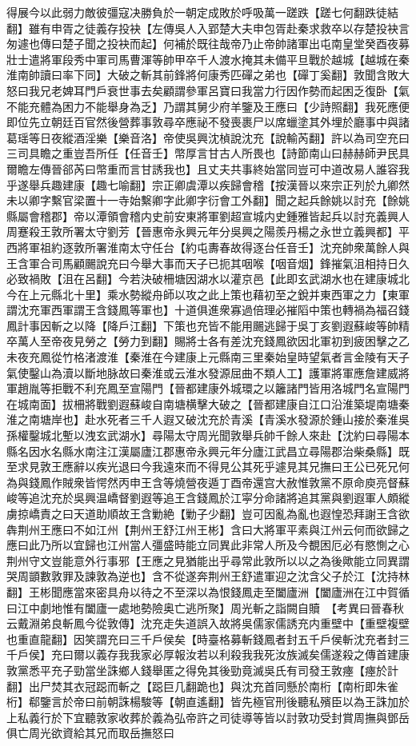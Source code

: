 得展今以此弱力敵彼彊寇决勝負於一朝定成敗於呼吸萬一蹉跌【蹉七何翻跌徒結翻】雖有申胥之徒義存投袂【左傳吳人入郢楚大夫申包胥赴秦求救卒以存楚投袂言匆遽也傳曰楚子聞之投袂而起】何補於既往哉帝乃止帝帥諸軍出屯南皇堂癸酉夜募壯士遣將軍段秀中軍司馬曹渾等帥甲卒千人渡水掩其未備平旦戰於越城【越城在秦淮南帥讀曰率下同】大破之斬其前鋒將何康秀匹磾之弟也【磾丁奚翻】敦聞含敗大怒曰我兄老婢耳門戶衰世事去矣顧謂參軍呂寶曰我當力行因作勢而起困乏復卧【氣不能充體為困力不能舉身為乏】乃謂其舅少府羊鑒及王應曰【少詩照翻】我死應便即位先立朝廷百官然後營葬事敦尋卒應祕不發喪裹尸以席蠟塗其外埋於廳事中與諸葛瑶等日夜縱酒淫樂【樂音洛】帝使吳興沈楨說沈充【說輸芮翻】許以為司空充曰三司具瞻之重豈吾所任【任音壬】幣厚言甘古人所畏也【詩節南山曰赫赫師尹民具爾瞻左傳晉郤芮曰幣重而言甘誘我也】且丈夫共事終始當同豈可中道改易人誰容我乎遂舉兵趣建康【趣七喻翻】宗正卿虞潭以疾歸會稽【按漢晉以來宗正列於九卿然未以卿字繫官梁置十一寺始繫卿字此卿字衍會工外翻】聞之起兵餘姚以討充【餘姚縣屬會稽郡】帝以潭領會稽内史前安東將軍劉超宣城内史鍾雅皆起兵以討充義興人周蹇殺王敦所署太守劉芳【晉惠帝永興元年分吳興之陽羨丹楊之永世立義興都】平西將軍祖約逐敦所署淮南太守任台【約屯夀春故得逐台任音壬】沈充帥衆萬餘人與王含軍合司馬顧颺說充曰今舉大事而天子已扼其咽喉【咽音烟】鋒摧氣沮相持日久必致禍敗【沮在呂翻】今若決破柵塘因湖水以灌京邑【此即玄武湖水也在建康城北今在上元縣北十里】乘水勢縱舟師以攻之此上策也藉初至之銳并東西軍之力【東軍謂沈充軍西軍謂王含錢鳳等軍也】十道俱進衆寡過倍理必摧䧟中策也轉禍為福召錢鳳計事因斬之以降【降戶江翻】下策也充皆不能用颺逃歸于吳丁亥劉遐蘇峻等帥精卒萬人至帝夜見勞之【勞力到翻】賜將士各有差沈充錢鳳欲因北軍初到疲困擊之乙未夜充鳳從竹格渚渡淮【秦淮在今建康上元縣南三里秦始皇時望氣者言金陵有天子氣使鑿山為瀆以斷地脉故曰秦淮或云淮水發源屈曲不類人工】護軍將軍應詹建威將軍趙胤等拒戰不利充鳳至宣陽門【晉都建康外城環之以籬諸門皆用洛城門名宣陽門在城南面】拔柵將戰劉遐蘇峻自南塘横擊大破之【晉都建康自江口沿淮築堤南塘秦淮之南塘岸也】赴水死者三千人遐又破沈充於青溪【青溪水發源於鍾山接於秦淮吳孫權鑿城北塹以洩玄武湖水】尋陽太守周光聞敦舉兵帥千餘人來赴【沈約曰尋陽本縣名因水名縣水南注江漢屬廬江郡惠帝永興元年分廬江武昌立尋陽郡治柴桑縣】既至求見敦王應辭以疾光退曰今我遠來而不得見公其死乎遽見其兄撫曰王公已死兄何為與錢鳳作賊衆皆愕然丙申王含等燒營夜遁丁酉帝還宫大赦惟敦黨不原命庾亮督蘇峻等追沈充於吳興温嶠督劉遐等追王含錢鳳於江寜分命諸將追其黨與劉遐軍人頗縱虜掠嶠責之曰天道助順故王含勦絶【勦子少翻】豈可因亂為亂也遐惶恐拜謝王含欲犇荆州王應曰不如江州【荆州王舒江州王彬】含曰大將軍平素與江州云何而欲歸之應曰此乃所以宜歸也江州當人彊盛時能立同異此非常人所及今覩困厄必有愍惻之心荆州守文豈能意外行事邪【王應之見猶能出乎尋常此敦所以以之為後歟能立同異謂哭周顗數敦罪及諫敦為逆也】含不從遂奔荆州王舒遣軍迎之沈含父子於江【沈持林翻】王彬聞應當來密具舟以待之不至深以為恨錢鳳走至闔廬洲【闔廬洲在江中賀循曰江中劇地惟有闔廬一處地勢險奥亡逃所聚】周光斬之詣闕自贖　【考異曰晉春秋云戴淵弟良斬鳳今從敦傳】沈充走失道誤入故將吳儒家儒誘充内重壁中【重壁複壁也重直龍翻】因笑謂充曰三千戶侯矣【時臺格募斬錢鳳者封五千戶侯斬沈充者封三千戶侯】充曰爾以義存我我家必厚報汝若以利殺我我死汝族滅矣儒遂殺之傳首建康敦黨悉平充子勁當坐誅鄉人錢舉匿之得免其後勁竟滅吳氏有司發王敦瘞【瘞於計翻】出尸焚其衣冠跽而斬之【跽巨几翻跪也】與沈充首同懸於南桁【南桁即朱雀桁】郗鑒言於帝曰前朝誅楊駿等【朝直遙翻】皆先極官刑後聽私殯臣以為王誅加於上私義行於下宜聽敦家收葬於義為弘帝許之司徒導等皆以討敦功受封賞周撫與鄧岳俱亡周光欲資給其兄而取岳撫怒曰